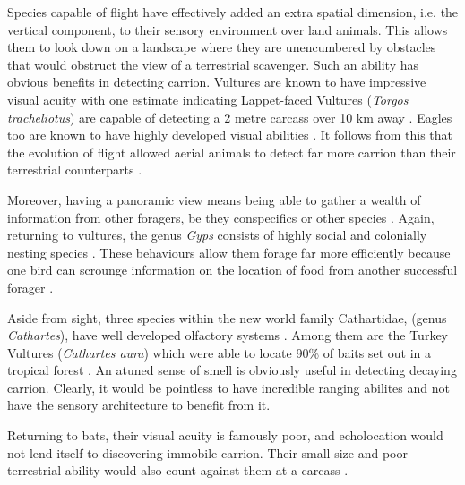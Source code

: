 \documentclass[a4paper,12pt]{article}
\begin{document}
Species capable of flight have effectively added an extra spatial dimension, i.e. the vertical component, to their sensory environment over land animals.
This allows them to look down on a landscape where they are unencumbered by obstacles that would obstruct the view of a terrestrial scavenger.
Such an ability has obvious benefits in detecting carrion.
Vultures are known to have impressive visual acuity with one estimate indicating Lappet-faced Vultures (\textit{Torgos tracheliotus}) are capable of detecting a 2 metre carcass over 10 km away \citep{spiegel2013factors}.
Eagles too are known to have highly developed visual abilities \citep{reymond1985spatial}.
It follows from this that the evolution of flight allowed aerial animals to detect far more carrion than their terrestrial counterparts \citep{AR:AR22815}.

Moreover, having a panoramic view means being able to gather a wealth of information from other foragers, be they conspecifics or other species \citep{jackson2008effect}.
Again, returning to vultures, the genus \textit{Gyps} consists of highly social and colonially nesting species \citep{fernandez2015density}.
These behaviours allow them forage far more efficiently because one bird can scrounge information on the location of food from another successful forager \citep{KaneVul}.

Aside from sight, three species within the new world family Cathartidae, (genus \textit{Cathartes}), have well developed olfactory systems \citep{AR:AR22815}.
Among them are the Turkey Vultures (\textit{Cathartes aura}) which were able to locate 90\% of baits set out in a tropical forest \citep{houston1986olfaction}. An atuned sense of smell is obviously useful in detecting decaying carrion.
Clearly, it would be pointless to have incredible ranging abilites and not have the sensory architecture to benefit from it. %

Returning to bats, their visual acuity is famously poor, and echolocation would not lend itself to discovering immobile carrion.
Their small size and poor terrestrial ability would also count against them at a carcass \citep{riskin2006terrestrial}.
\end{document}
